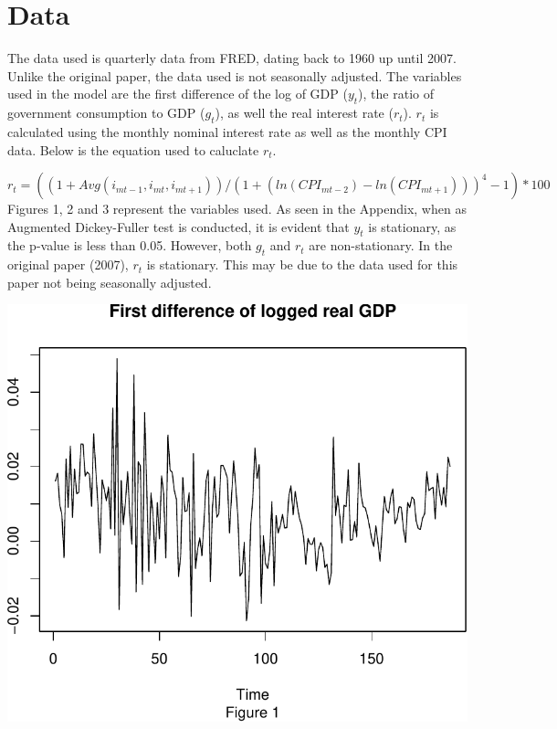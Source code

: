 \documentclass[11pt,preprint, authoryear]{elsarticle}
\numberwithin{equation}{section}
\numberwithin{figure}{section}
\numberwithin{table}{section}
\begin{document}
\hypertarget{data}{%
\section{Data}\label{data}}

The data used is quarterly data from FRED, dating back to 1960 up until
2007. Unlike the original paper, the data used is not seasonally
adjusted. The variables used in the model are the first difference of
the log of GDP (\(y_t\)), the ratio of government consumption to GDP
(\(g_t\)), as well the real interest rate (\(r_t\)). \(r_t\) is
calculated using the monthly nominal interest rate as well as the
monthly CPI data. Below is the equation used to caluclate \(r_t\).

\[ r_t = ((1 + Avg(i_{mt-1}, i_{mt}, i_{mt+1}))/(1+(ln(CPI_{mt-2}) - ln(CPI_{mt+1}))) ^ 4 - 1)*100 \]
Figures 1, 2 and 3 represent the variables used. As seen in the
Appendix, when as Augmented Dickey-Fuller test is conducted, it is
evident that \(y_t\) is stationary, as the p-value is less than 0.05.
However, both \(g_t\) and \(r_t\) are non-stationary. In the original
paper (2007), \(r_t\) is stationary. This may be due to the data used
for this paper not being seasonally adjusted.

\includegraphics{TS_proj_files/figure-latex/unnamed-chunk-12-1.pdf}
\end{document}

